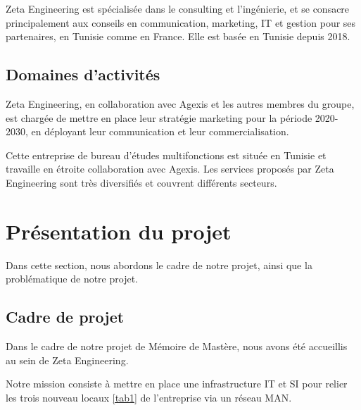 Zeta Engineering est spécialisée dans le consulting et l'ingénierie, et se consacre principalement aux conseils en communication, marketing, IT et gestion pour ses partenaires, en Tunisie comme en France. Elle est basée en Tunisie depuis 2018.

\subsection{Domaines d'activités}
Zeta Engineering, en collaboration avec Agexis et les autres membres du groupe, est chargée de mettre en place leur stratégie marketing pour la période 2020-2030, en déployant leur communication et leur commercialisation.

Cette entreprise de bureau d'études multifonctions est située en Tunisie et travaille en étroite collaboration avec Agexis. Les services proposés par Zeta Engineering sont très diversifiés et couvrent différents secteurs.
\section{Présentation du projet}

Dans cette section, nous abordons le cadre de notre projet, ainsi que la problématique de notre projet.

\subsection{Cadre de projet}
Dans le cadre de notre projet de Mémoire de Mastère, nous avons été accueillis au sein de Zeta Engineering. 

Notre mission consiste à mettre en place une infrastructure IT et SI pour relier les trois nouveau locaux \ref{tab1} de l'entreprise via un réseau MAN.\\


